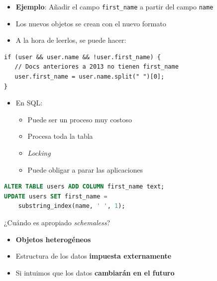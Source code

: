 \begin{frame}
\framebreak

\begin{itemize}
\item {\bf Ejemplo}: Añadir el campo {\tt first\_name} a partir del campo
  {\tt name}
\item Los nuevos objetos se crean con el nuevo formato
\item A la hora de leerlos, se puede hacer:
\end{itemize}
\begin{lstlisting}
if (user && user.name && !user.first_name) {
   // Docs anteriores a 2013 no tienen first_name
   user.first_name = user.name.split(" ")[0];
}
\end{lstlisting}

\framebreak

\begin{itemize}
\item En SQL:
  \begin{itemize}
  \item Puede ser un proceso muy costoso
  \item Procesa toda la tabla
  \item {\em Locking}
  \item Puede obligar a parar las aplicaciones
  \end{itemize}
\end{itemize}
\begin{lstlisting}[language=SQL]
ALTER TABLE users ADD COLUMN first_name text;
UPDATE users SET first_name =
    substring_index(name, ' ', 1);
\end{lstlisting}

\framebreak

\begin{block}{¿Cuándo es apropiado {\em schemaless}?}
  \begin{itemize}
  \item {\bf Objetos heterogéneos}
\item Estructura de los datos {\bf impuesta externamente}
\item Si intuimos que los datos {\bf cambiarán en el futuro}
  \end{itemize}
\end{block}




\end{frame}
